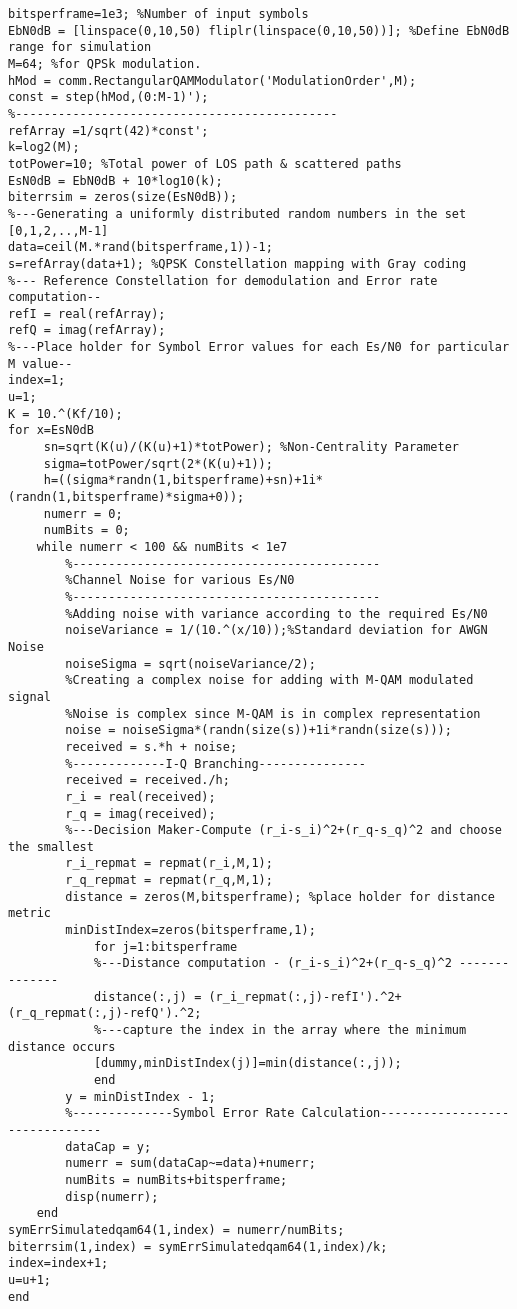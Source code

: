 \begin{lstlisting}[breaklines]
%% 64 QAM Modulation...
bitsperframe=1e3; %Number of input symbols
EbN0dB = [linspace(0,10,50) fliplr(linspace(0,10,50))]; %Define EbN0dB range for simulation
M=64; %for QPSk modulation.
hMod = comm.RectangularQAMModulator('ModulationOrder',M);
const = step(hMod,(0:M-1)');
%---------------------------------------------
refArray =1/sqrt(42)*const';
k=log2(M);
totPower=10; %Total power of LOS path & scattered paths
EsN0dB = EbN0dB + 10*log10(k);
biterrsim = zeros(size(EsN0dB));
%---Generating a uniformly distributed random numbers in the set [0,1,2,..,M-1]
data=ceil(M.*rand(bitsperframe,1))-1;
s=refArray(data+1); %QPSK Constellation mapping with Gray coding
%--- Reference Constellation for demodulation and Error rate computation--
refI = real(refArray);
refQ = imag(refArray);
%---Place holder for Symbol Error values for each Es/N0 for particular M value--
index=1;
u=1;
K = 10.^(Kf/10);
for x=EsN0dB
     sn=sqrt(K(u)/(K(u)+1)*totPower); %Non-Centrality Parameter
     sigma=totPower/sqrt(2*(K(u)+1));
     h=((sigma*randn(1,bitsperframe)+sn)+1i*(randn(1,bitsperframe)*sigma+0));
     numerr = 0;
     numBits = 0;
    while numerr < 100 && numBits < 1e7
        %-------------------------------------------
        %Channel Noise for various Es/N0
        %-------------------------------------------
        %Adding noise with variance according to the required Es/N0
        noiseVariance = 1/(10.^(x/10));%Standard deviation for AWGN Noise
        noiseSigma = sqrt(noiseVariance/2);
        %Creating a complex noise for adding with M-QAM modulated signal
        %Noise is complex since M-QAM is in complex representation
        noise = noiseSigma*(randn(size(s))+1i*randn(size(s)));
        received = s.*h + noise;
        %-------------I-Q Branching---------------
        received = received./h;
        r_i = real(received);
        r_q = imag(received);
        %---Decision Maker-Compute (r_i-s_i)^2+(r_q-s_q)^2 and choose the smallest
        r_i_repmat = repmat(r_i,M,1);
        r_q_repmat = repmat(r_q,M,1);
        distance = zeros(M,bitsperframe); %place holder for distance metric
        minDistIndex=zeros(bitsperframe,1);
            for j=1:bitsperframe
            %---Distance computation - (r_i-s_i)^2+(r_q-s_q)^2 --------------
            distance(:,j) = (r_i_repmat(:,j)-refI').^2+(r_q_repmat(:,j)-refQ').^2;
            %---capture the index in the array where the minimum distance occurs
            [dummy,minDistIndex(j)]=min(distance(:,j));
            end
        y = minDistIndex - 1;
        %--------------Symbol Error Rate Calculation-------------------------------
        dataCap = y;
        numerr = sum(dataCap~=data)+numerr;
        numBits = numBits+bitsperframe;
        disp(numerr);
    end
symErrSimulatedqam64(1,index) = numerr/numBits;
biterrsim(1,index) = symErrSimulatedqam64(1,index)/k;
index=index+1;
u=u+1;
end


\end{lstlisting}
